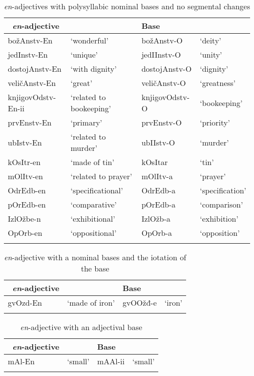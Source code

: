\documentclass[output=paper]{langsci/langscibook}
\begin{document}
\begin{table}    
\caption{\textit{en}-adjectives with polysyllabic nominal bases and no segmental changes} 
\label{tabapp10}          
 \begin{tabular}{l l l l}          
\lsptoprule            
\ \textit{en}-adjective &  & Base & 
\\
\hline
božAnstv-En & `wonderful' & božAnstv-O & `deity' 
\\  jedInstv-En & `unique' & jedIInstv-O & `unity' 
\\  dostojAnstv-En & `with dignity' & dostojAnstv-O & `dignity' 
\\  veličAnstv-En & `great' & veličAnstv-O & `greatness' 
\\  knjigovOdstv-En-ii & `related to bookeeping' & knjigovOdstv-O & `bookeeping' 
\\  prvEnstv-En & `primary' & prvEnstv-O & `priority' 
\\  ubIstv-En & `related to murder' & ubIIstv-O & `murder' 
\\  kOsItr-en & `made of tin' & kOsItar & `tin' 
\\  mOlItv-en & `related to prayer' & mOlItv-a & `prayer' 
\\  OdrEdb-en & `specificational' & OdrEdb-a & `specification' 
\\  pOrEdb-en & `comparative' & pOrEdb-a & `comparison' 
\\  IzlOžbe-n & `exhibitional' & IzlOžb-a & `exhibition' 
\\  OpOrb-en & `oppositional' & OpOrb-a & `opposition' 
\\
 \lspbottomrule          
 \end{tabular}          
\end{table}           
          
\begin{table}          
\caption{\textit{en}-adjective with a nominal bases and the iotation of the base}
\label{tabapp11}          
 \begin{tabular}{ l l l l}          
\lsptoprule            
\ \textit{en}-adjective &  & Base &      
\\ 
\hline
gvOzd-En & `made of iron' & gvOOžđ-e & `iron' 
\\
 \lspbottomrule          
 \end{tabular}          
\end{table}           
          
\begin{table}  
\caption{\textit{en}-adjective with an adjectival base}          
\label{tabapp12}          
 \begin{tabular}{ l l l l}          
\lsptoprule            
\ \textit{en}-adjective &  & Base &  
\\
\hline
mAl-En & `small' & mAAl-ii & `small'
\\
 \lspbottomrule          
 \end{tabular}          
\end{table}           
          
\end{document}
